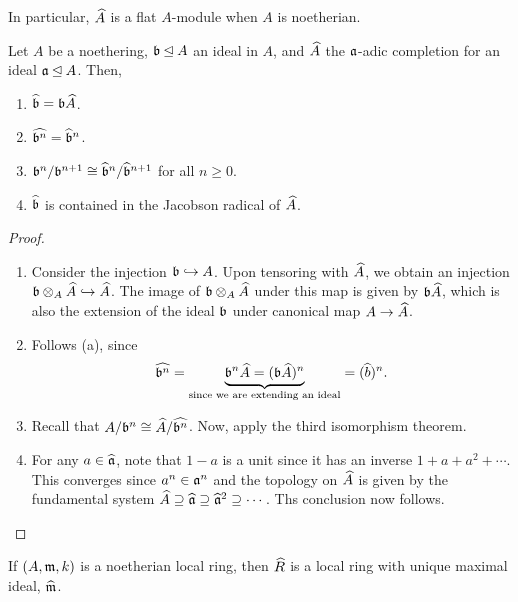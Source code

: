 \begin{corollary}
    In particular, $\widehat{A}$ is a flat $A$-module when $A$ is noetherian.
\end{corollary}

\begin{proposition}
    Let $A$ be a noethering, $\mathfrak b\unlhd A$ an ideal in $A$, and $\widehat{A}$ the $\mathfrak a$-adic completion for an ideal $\mathfrak a\unlhd A$. Then, 
    \begin{enumerate}[label=(\alph*)]
        \item $\widehat{\mathfrak b} = \mathfrak b\widehat{A}$. 
        \item $\widehat{\mathfrak b^n} = \widehat{\mathfrak b}^n$. 
        \item $\mathfrak b^n/\mathfrak b^{n + 1}\cong\widehat{\mathfrak b}^n/\widehat{\mathfrak b}^{n + 1}$ for all $n\ge 0$. 
        \item $\widehat{\mathfrak b}$ is contained in the Jacobson radical of $\widehat{A}$.
    \end{enumerate}
\end{proposition}
\begin{proof}
\begin{enumerate}[label=(\alph*)]
    \item Consider the injection $\mathfrak b\hookrightarrow A$. Upon tensoring with $\widehat{A}$, we obtain an injection $\mathfrak b\otimes_A\widehat{A}\hookrightarrow\widehat{A}$. The image of $\mathfrak b\otimes_A\widehat{A}$ under this map is given by $\mathfrak b\widehat{A}$, which is also the extension of the ideal $\mathfrak b$ under canonical map $A\to\widehat{A}$.

    \item Follows (a), since 
    \begin{equation*}
        \widehat{\mathfrak b^n} = \underbrace{\mathfrak b^n\widehat{A} = (\mathfrak b\widehat{A})^n}_{\text{since we are extending an ideal}} = (\widehat{b})^n.
    \end{equation*}

    \item Recall that $A/\mathfrak b^n\cong\widehat{A}/\widehat{\mathfrak b^n}$. Now, apply the third isomorphism theorem. 
    
    \item For any $a\in\widehat{\mathfrak a}$, note that $1 - a$ is a unit since it has an inverse $1 + a + a^2 + \cdots$. This converges since $a^n\in\mathfrak a^n$ and the topology on $\widehat{A}$ is given by the fundamental system $\widehat{A}\supseteq\widehat{\mathfrak a}\supseteq\widehat{\mathfrak a}^2\supseteq\cdots$. Ths conclusion now follows.\qedhere
\end{enumerate}
\end{proof}

\begin{corollary}
    If $(A,\mathfrak m,k)$ is a noetherian local ring, then $\widehat{R}$ is a local ring with unique maximal ideal, $\widehat{\mathfrak m}$.
\end{corollary}